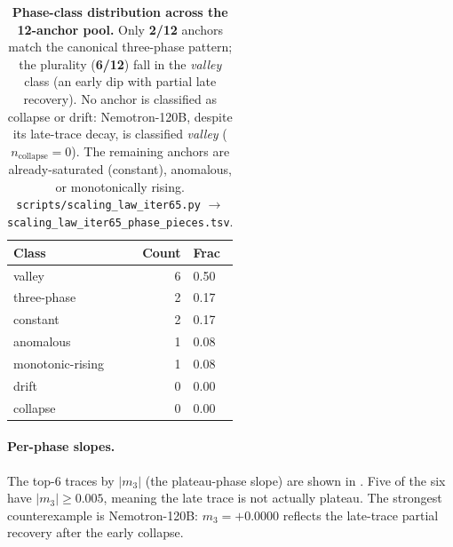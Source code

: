 \begin{table}[t]
  \centering
  \small
  \begin{tabular}{lrl}
    \toprule
    Class & Count & Frac \\
    \midrule
    valley & 6 & 0.50 \\
    three-phase & 2 & 0.17 \\
    constant & 2 & 0.17 \\
    anomalous & 1 & 0.08 \\
    monotonic-rising & 1 & 0.08 \\
    drift & 0 & 0.00 \\
    collapse & 0 & 0.00 \\
    \bottomrule
  \end{tabular}
  \caption{\textbf{Phase-class distribution across the 12-anchor
    pool.}  Only \textbf{2/12}
    anchors match the canonical three-phase pattern; the plurality
    (\textbf{6/12}) fall in the \emph{valley} class (an early dip with
    partial late recovery).  No anchor is classified as collapse or
    drift: Nemotron-120B, despite its late-trace decay, is classified
    \emph{valley} ($n_{\text{collapse}}=0$).  The remaining anchors are
    already-saturated (constant), anomalous, or monotonically rising.
    \texttt{scripts/scaling\_law\_iter65.py}
    $\to$ \texttt{scaling\_law\_iter65\_phase\_pieces.tsv}.}
  \label{tab:iter65-class-dist}
\end{table}

\paragraph{Per-phase slopes.}
The top-6 traces by $|m_3|$ (the plateau-phase slope) are
shown in .  Five of the six
have $|m_3| \geq 0.005$, meaning the late trace is not actually
plateau.  The strongest counterexample is Nemotron-120B:
$m_3 = +0.0000$ reflects
the late-trace partial recovery after the early collapse.

